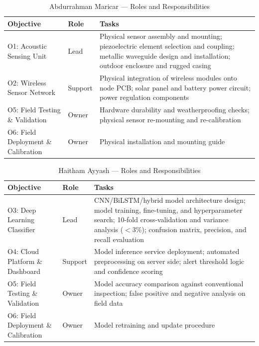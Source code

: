 \documentclass[12pt,a4paper,oneside]{memoir}
\begin{document}
\begin{table}[H]
\centering
\caption{Abdurrahman Maricar --- Roles and Responsibilities}
\label{tab:roles_abd}
\renewcommand{\arraystretch}{1.3}
\begin{tabular}{>{\raggedright\arraybackslash}p{3.5cm} p{1.8cm} >{\raggedright\arraybackslash}p{8.0cm}}
\toprule
\textbf{Objective} & \textbf{Role} & \textbf{Tasks} \\
\midrule
O1: Acoustic Sensing Unit & Lead & Physical sensor assembly and mounting; piezoelectric
element selection and coupling; metallic waveguide design
and installation; outdoor enclosure and rugged casing \\
O2: Wireless Sensor Network & Support & Physical integration of wireless modules onto node PCB;
solar panel and battery power circuit; power regulation
components \\
O5: Field Testing \& Validation & Owner & Hardware durability and weatherproofing checks; physical
sensor re-mounting and re-calibration \\
O6: Field Deployment \& Calibration & Owner & Physical installation and mounting guide \\
\bottomrule
\end{tabular}
\end{table}

\begin{table}[H]
\centering
\caption{Haitham Ayyash --- Roles and Responsibilities}
\label{tab:roles_haitham}
\renewcommand{\arraystretch}{1.3}
\begin{tabular}{>{\raggedright\arraybackslash}p{3.5cm} p{1.8cm} >{\raggedright\arraybackslash}p{8.0cm}}
\toprule
\textbf{Objective} & \textbf{Role} & \textbf{Tasks} \\
\midrule
O3: Deep Learning Classifier & Lead & CNN/BiLSTM/hybrid model architecture design; model
training, fine-tuning, and hyperparameter search; 10-fold
cross-validation and variance analysis ($<$3\%); confusion
matrix, precision, and recall evaluation \\
O4: Cloud Platform \& Dashboard & Support & Model inference service deployment; automated
preprocessing on server side; alert threshold logic and
confidence scoring \\
O5: Field Testing \& Validation & Owner & Model accuracy comparison against conventional inspection;
false positive and negative analysis on field data \\
O6: Field Deployment \& Calibration & Owner & Model retraining and update procedure \\
\bottomrule
\end{tabular}
\end{table}
\end{document}
